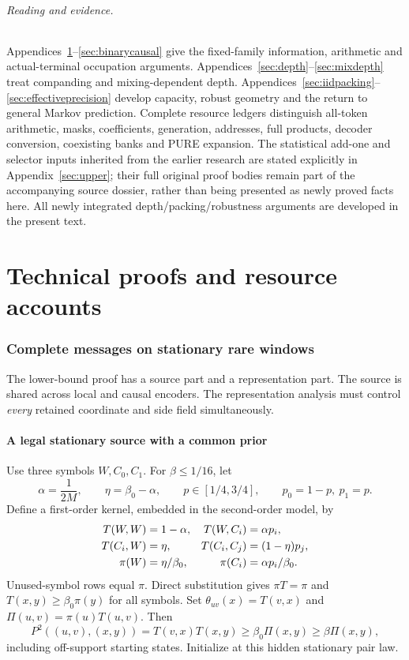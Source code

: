 \documentclass[11pt,letterpaper]{article}
\theoremstyle{definition}\newtheorem{definition}[theorem]{Definition}
\theoremstyle{remark}\newtheorem{remark}[theorem]{Remark}
\newcommand{\betaz}{\beta_0}
\begin{document}
\paragraph{Reading and evidence.}
Appendices~\ref{sec:lower}--\ref{sec:binarycausal} give the fixed-family information, arithmetic and actual-terminal occupation arguments. Appendices~\ref{sec:depth}--\ref{sec:mixdepth} treat companding and mixing-dependent depth. Appendices~\ref{sec:iidpacking}--\ref{sec:effectiveprecision} develop capacity, robust geometry and the return to general Markov prediction. Complete resource ledgers distinguish all-token arithmetic, masks, coefficients, generation, addresses, full products, decoder conversion, coexisting banks and PURE expansion. The statistical add-one and selector inputs inherited from the earlier research are stated explicitly in Appendix~\ref{sec:upper}; their full original proof bodies remain part of the accompanying source dossier, rather than being presented as newly proved facts here. All newly integrated depth/packing/robustness arguments are developed in the present text.

\clearpage
\appendix
\part*{Technical proofs and resource accounts}
\section{Complete messages on stationary rare windows}\label{sec:lower}
The lower-bound proof has a source part and a representation part. The source is shared across local and causal encoders. The representation analysis must control \emph{every} retained coordinate and side field simultaneously.

\subsection{A legal stationary source with a common prior}
Use three symbols $W,C_0,C_1$. For $\beta\le1/16$, let
\[
 \alpha=\frac1{2M},\qquad \eta=\betaz-\alpha,\qquad
 p\in[1/4,3/4],\qquad p_0=1-p,\ p_1=p.
\]
Define a first-order kernel, embedded in the second-order model, by
\begin{align}\label{eq:witness}
 T(W,W)&=1-\alpha,& T(W,C_i)&=\alpha p_i,\notag\\
 T(C_i,W)&=\eta,& T(C_i,C_j)&=(1-\eta)p_j,\\
 \pi(W)&=\eta/\betaz,& \pi(C_i)&=\alpha p_i/\betaz.\notag
\end{align}
Unused-symbol rows equal $\pi$. Direct substitution gives $\pi T=\pi$ and $T(x,y)\ge\betaz\pi(y)$ for all symbols. Set $\theta_{uv}(x)=T(v,x)$ and $\Pi(u,v)=\pi(u)T(u,v)$. Then
\[
 P^2((u,v),(x,y))=T(v,x)T(x,y)\ge\betaz\Pi(x,y)\ge\beta\Pi(x,y),
\]
including off-support starting states. Initialize at this hidden stationary pair law.
\end{document}
